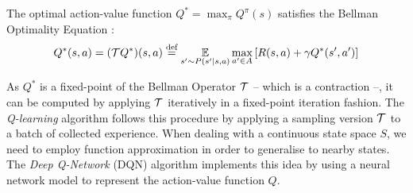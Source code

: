 \documentclass{article}
\begin{document}
The optimal action-value function $Q^* =  \max_\pi Q^\pi(s)$ satisfies the Bellman Optimality Equation \citep{bellman}:
\begin{equation*}
Q^*(s, a) = (\cT Q^*) (s, a) \eqdef \expectedvalueover{s'\sim P(s'|s, a)} \max_{a'\in A} \left[R(s, a) + \gamma Q^*(s', a')\right]
\end{equation*}

As $Q^*$ is a fixed-point of the Bellman Operator $\mathcal{T}$ -- which is a contraction --, it can be computed by applying $\mathcal{T}$ iteratively in a fixed-point iteration fashion. The \emph{Q-learning} algorithm \citep{Watkins} follows this procedure by applying a sampling version $\mathcal{T}$ to a batch of collected experience. When dealing with a continuous state space $S$, we need to employ function approximation in order to generalise to nearby states. The \emph{Deep Q-Network} (DQN) algorithm \citep{Mnih} implements this idea by using a neural network model to represent the action-value function $Q$.
\end{document}
